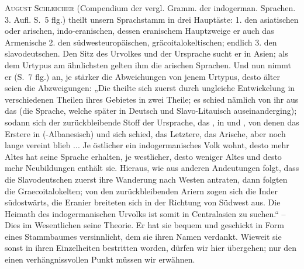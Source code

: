 \label{fp.174}

\textsc{August Schleicher} (Compendium der vergl. Gramm. der indogerman. Sprachen. 3. Aufl. S.~5 flg.) theilt unsern Sprachstamm in drei Hauptäste: 1. den asiatischen oder arischen, indo-eranischen, dessen eranischem Hauptzweige er auch das Armenische  2. den südwesteuropäischen, gräcoitalokeltischen; endlich 3. den slavodeutschen. Den Sitz des Urvolkes und der Ursprache sucht er in Asien; als dem Urtypus am ähnlichsten gelten ihm die arischen Sprachen. Und nun nimmt er (S.~7 flg.) an, je stärker die Abweichungen von jenem Urtypus, desto älter seien die Abzweigungen: „Die  theilte sich zuerst durch ungleiche Entwickelung in verschiedenen Theilen ihres Gebietes in zwei Theile; es schied nämlich von ihr aus das  (die Sprache, welche später in Deutsch und Slavo-Litauisch auseinanderging); sodann  sich der zurückbleibende Stoff der Ursprache, das , in  und , von denen das Erstere in  (-Albanesisch) und  sich schied, das Letztere, das Arische, aber noch lange vereint blieb ... Je östlicher ein indogermanisches \label{sp.164} Volk wohnt, desto mehr Altes hat seine Sprache erhalten, je westlicher, desto weniger Altes und desto mehr Neubildungen enthält sie. Hieraus, wie aus anderen Andeutungen folgt, dass die Slavodeutschen zuerst ihre Wanderung nach Westen antraten, dann folgten die Graecoitalokelten; von den zurückbleibenden Ariern zogen sich die Inder südostwärts, die Eranier breiteten sich in der Richtung von Südwest aus. Die Heimath des indogermanischen Urvolks ist somit in Centralasien zu suchen.“ – Dies im Wesentlichen seine Theorie. Er hat sie bequem und geschickt in Form eines Stammbaumes versinnlicht, dem sie  ihren Namen verdankt. Wieweit sie sonst in ihren Einzelheiten bestritten worden, dürfen wir hier übergehen; nur den einen verhängnissvollen Punkt müssen wir erwähnen.

